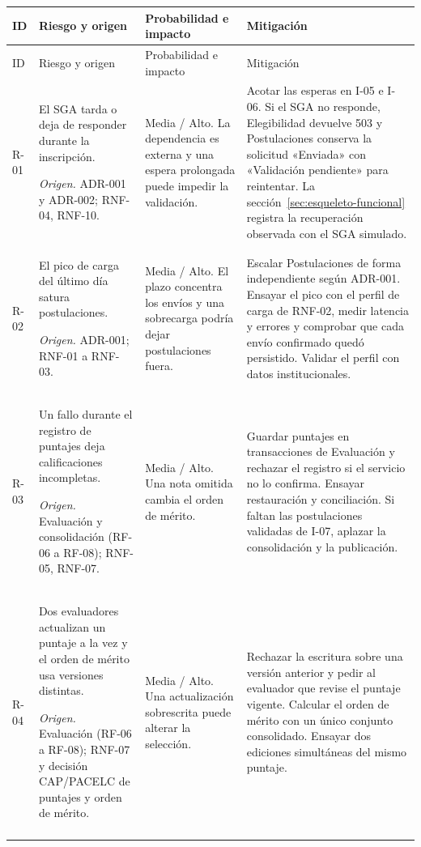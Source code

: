 \begingroup
\small
\begin{longtable}{@{}>{\raggedright\arraybackslash}p{.09\linewidth}>{\raggedright\arraybackslash}p{.29\linewidth}>{\raggedright\arraybackslash}p{.21\linewidth}>{\raggedright\arraybackslash}p{.28\linewidth}@{}}
\toprule
ID & Riesgo y origen & Probabilidad e impacto & Mitigación \\
\midrule
\endfirsthead
\toprule
ID & Riesgo y origen & Probabilidad e impacto & Mitigación \\
\midrule
\endhead
\midrule
\endfoot
\bottomrule
\endlastfoot
R-01 & El SGA tarda o deja de responder durante la inscripción. \par\textit{Origen.} ADR-001 y ADR-002; RNF-04, RNF-10. & Media / Alto. La dependencia es externa y una espera prolongada puede impedir la validación. & Acotar las esperas en I-05 e I-06. Si el SGA no responde, Elegibilidad devuelve 503 y Postulaciones conserva la solicitud «Enviada» con «Validación pendiente» para reintentar. La sección~\ref{sec:esqueleto-funcional} registra la recuperación observada con el SGA simulado. \\ \addlinespace
R-02 & El pico de carga del último día satura postulaciones. \par\textit{Origen.} ADR-001; RNF-01 a RNF-03. & Media / Alto. El plazo concentra los envíos y una sobrecarga podría dejar postulaciones fuera. & Escalar Postulaciones de forma independiente según ADR-001. Ensayar el pico con el perfil de carga de RNF-02, medir latencia y errores y comprobar que cada envío confirmado quedó persistido. Validar el perfil con datos institucionales. \\ \addlinespace
R-03 & Un fallo durante el registro de puntajes deja calificaciones incompletas. \par\textit{Origen.} Evaluación y consolidación (RF-06 a RF-08); RNF-05, RNF-07. & Media / Alto. Una nota omitida cambia el orden de mérito. & Guardar puntajes en transacciones de Evaluación y rechazar el registro si el servicio no lo confirma. Ensayar restauración y conciliación. Si faltan las postulaciones validadas de I-07, aplazar la consolidación y la publicación. \\ \addlinespace
R-04 & Dos evaluadores actualizan un puntaje a la vez y el orden de mérito usa versiones distintas. \par\textit{Origen.} Evaluación (RF-06 a RF-08); RNF-07 y decisión CAP/PACELC de puntajes y orden de mérito. & Media / Alto. Una actualización sobrescrita puede alterar la selección. & Rechazar la escritura sobre una versión anterior y pedir al evaluador que revise el puntaje vigente. Calcular el orden de mérito con un único conjunto consolidado. Ensayar dos ediciones simultáneas del mismo puntaje. \\ \addlinespace

\end{longtable}

